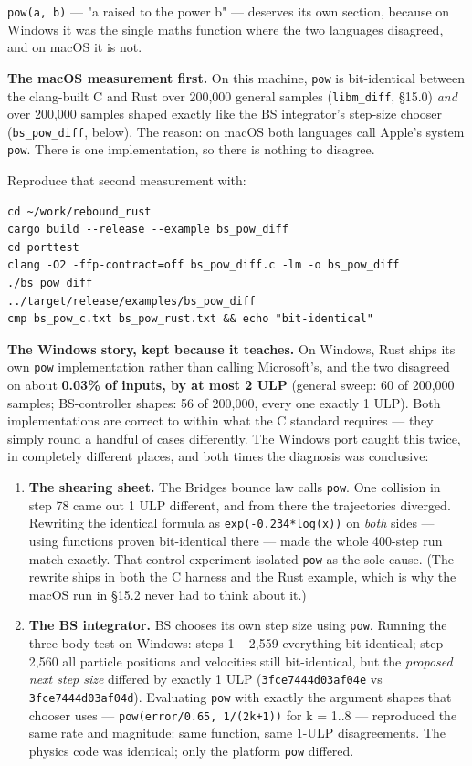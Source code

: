 \documentclass[11pt]{article}
\begin{document}
\texttt{pow(a, b)} --- "a raised to the power b" --- deserves its own section, because on Windows it was the single maths function where the two languages disagreed, and on macOS it is not.

\textbf{The macOS measurement first.} On this machine, \texttt{pow} is bit-identical between the clang-built C and Rust over 200,000 general samples (\texttt{libm\_diff}, \S{}15.0) \emph{and} over 200,000 samples shaped exactly like the BS integrator's step-size chooser (\texttt{bs\_pow\_diff}, below). The reason: on macOS both languages call Apple's system \texttt{pow}. There is one implementation, so there is nothing to disagree.

Reproduce that second measurement with:

\begin{lstlisting}
cd ~/work/rebound_rust
cargo build --release --example bs_pow_diff
cd porttest
clang -O2 -ffp-contract=off bs_pow_diff.c -lm -o bs_pow_diff
./bs_pow_diff
../target/release/examples/bs_pow_diff
cmp bs_pow_c.txt bs_pow_rust.txt && echo "bit-identical"
\end{lstlisting}

\textbf{The Windows story, kept because it teaches.} On Windows, Rust ships its own \texttt{pow} implementation rather than calling Microsoft's, and the two disagreed on about \textbf{0.03\% of inputs, by at most 2 ULP} (general sweep: 60 of 200,000 samples; BS-controller shapes: 56 of 200,000, every one exactly 1 ULP). Both implementations are correct to within what the C standard requires --- they simply round a handful of cases differently. The Windows port caught this twice, in completely different places, and both times the diagnosis was conclusive:

\begin{enumerate}
\item \textbf{The shearing sheet.} The Bridges bounce law calls \texttt{pow}. One collision in step 78 came out 1 ULP different, and from there the trajectories diverged. Rewriting the identical formula as \texttt{exp(-0.234*log(x))} on \emph{both} sides --- using functions proven bit-identical there --- made the whole 400-step run match exactly. That control experiment isolated \texttt{pow} as the sole cause. (The rewrite ships in both the C harness and the Rust example, which is why the macOS run in \S{}15.2 never had to think about it.)
\item \textbf{The BS integrator.} BS chooses its own step size using \texttt{pow}. Running the three-body test on Windows: steps 1 -- 2,559 everything bit-identical; step 2,560 all particle positions and velocities still bit-identical, but the \emph{proposed next step size} differed by exactly 1 ULP (\texttt{3fce7444d03af04e} vs \texttt{3fce7444d03af04d}). Evaluating \texttt{pow} with exactly the argument shapes that chooser uses --- \texttt{pow(error/0.65, 1/(2k+1))} for k = 1..8 --- reproduced the same rate and magnitude: same function, same 1-ULP disagreements. The physics code was identical; only the platform \texttt{pow} differed.
\end{enumerate}
\end{document}

